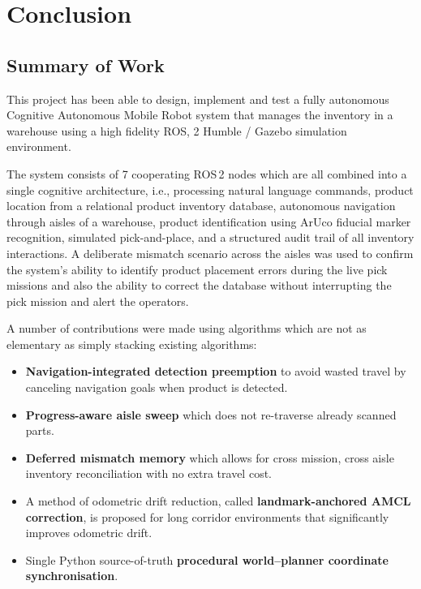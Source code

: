 \documentclass[12pt,a4paper]{report}
\begin{document}
\chapter{Conclusion}
\label{ch:conclusion}

\section{Summary of Work}

This project has been able to design, implement and test a fully autonomous Cognitive Autonomous Mobile Robot system that manages the inventory in a warehouse using a high fidelity ROS, 2 Humble / Gazebo simulation environment.

The system consists of 7 cooperating ROS\,2 nodes which are all combined into a single cognitive architecture, i.e., processing natural language commands, product location from a relational product inventory database, autonomous navigation through aisles of a warehouse, product identification using ArUco fiducial marker recognition, simulated pick-and-place, and a structured audit trail of all inventory interactions. A deliberate mismatch scenario across the aisles was used to confirm the system's ability to identify product placement errors during the live pick missions and also the ability to correct the database without interrupting the pick mission and alert the operators.

A number of contributions were made using algorithms which are not as elementary as simply stacking existing algorithms:

\begin{itemize}
    \item \textbf{Navigation-integrated detection preemption} to avoid wasted travel by canceling navigation goals when product is detected.
    \item \textbf{Progress-aware aisle sweep} which does not re-traverse already scanned parts.
    \item \textbf{Deferred mismatch memory} which allows for cross mission, cross aisle inventory reconciliation with no extra travel cost.
    \item A method of odometric drift reduction, called \textbf{landmark-anchored AMCL correction}, is proposed for long corridor environments that significantly improves odometric drift.
    \item Single Python source-of-truth \textbf{procedural world–planner coordinate synchronisation}.
\end{itemize}
\end{document}
